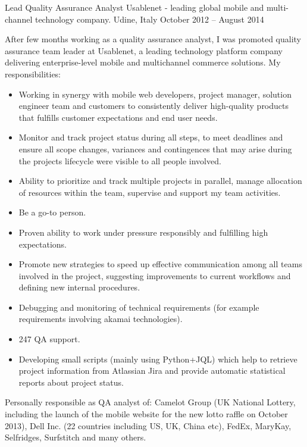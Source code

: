 \begin{cventries}
\cventry
{Lead Quality Assurance Analyst} 
{Usablenet - leading global mobile and multi-channel technology company.}
   {Udine, Italy}
{October 2012 -- August 2014}
   {
      After few months working as a quality assurance analyst, I was
      promoted 
   quality assurance team leader at Usablenet, a leading 
  technology platform  company delivering enterprise-level mobile and
  multichannel commerce solutions.
   My responsibilities:
   \begin{itemize}
\item 
  Working in synergy with mobile web
   developers, project manager, solution engineer team and customers to
   consistently deliver high-quality
   products that fulfills customer expectations and end user needs. 
\item Monitor and track project status during all steps, to meet deadlines
   and ensure all scope changes,
 variances and contingences that may arise during the 
 projects lifecycle were visible to all people involved.
 \item 
   Ability to prioritize and track multiple projects in parallel,
    manage  allocation of resources within the team, supervise and support my team
    activities.
 \item  Be a go-to person.
 \item 
   Proven ability to work under pressure responsibly and fulfilling high
   expectations.
\item Promote new strategies to speed up effective communication among all
   teams involved in the project, suggesting 
   improvements to current workflows and defining new internal procedures.
\item Debugging and monitoring of %
technical requirements (for example requirements involving
   akamai technologies).
\item 247 QA support.
   \item Developing small scripts (mainly using Python+JQL) which help to retrieve project
 information from Atlassian Jira and provide automatic statistical reports about
 project status.
 \end{itemize} 
   Personally responsible as QA analyst of:
   Camelot Group (UK National Lottery, including the
   launch of the mobile website for the new lotto raffle on October 2013), Dell Inc. (22 countries
   including US, UK, China etc), FedEx,
   MaryKay, Selfridges, Surfstitch and many others.
}
\end{cventries}
